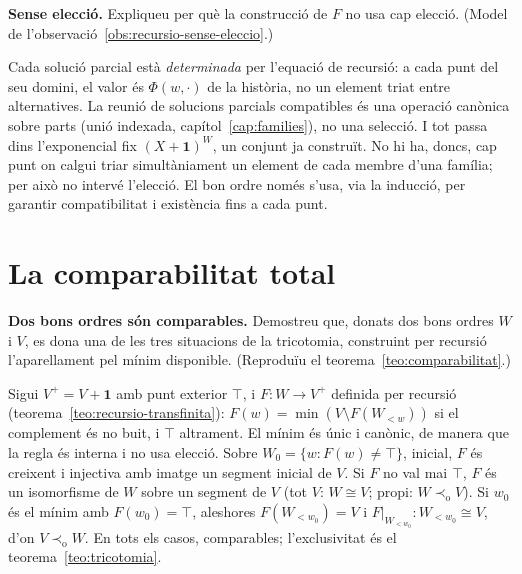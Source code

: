 \begin{exercici}
\textbf{Sense elecció.} Expliqueu per què la construcció de \(F\) no usa cap elecció. (Model de l'observació~\ref{obs:recursio-sense-eleccio}.)
\end{exercici}
\begin{solucio}
Cada solució parcial està \emph{determinada} per l'equació de recursió: a cada punt del seu domini, el valor és \(\Phi(w,\cdot)\) de la història, no un element triat entre alternatives. La reunió de solucions parcials compatibles és una operació canònica sobre parts (unió indexada, capítol~\ref{cap:families}), no una selecció. I tot passa dins l'exponencial fix \((X+\mathbf1)^W\), un conjunt ja construït. No hi ha, doncs, cap punt on calgui triar simultàniament un element de cada membre d'una família; per això no intervé l'elecció. El bon ordre només s'usa, via la inducció, per garantir compatibilitat i existència fins a cada punt.
\end{solucio}

\section{La comparabilitat total}\label{prac:comparabilitat}

\begin{exercici}
\textbf{Dos bons ordres són comparables.} Demostreu que, donats dos bons ordres \(W\) i \(V\), es dona una de les tres situacions de la tricotomia, construint per recursió l'aparellament pel mínim disponible. (Reproduïu el teorema~\ref{teo:comparabilitat}.)
\end{exercici}
\begin{solucio}
Sigui \(V^+=V+\mathbf1\) amb punt exterior \(\top\), i \(F\colon W\to V^+\) definida per recursió (teorema~\ref{teo:recursio-transfinita}): \(F(w)=\min(V\setminus F(W_{<w}))\) si el complement és no buit, i \(\top\) altrament. El mínim és únic i canònic, de manera que la regla és interna i no usa elecció. Sobre \(W_0=\{w:F(w)\ne\top\}\), inicial, \(F\) és creixent i injectiva amb imatge un segment inicial de \(V\). Si \(F\) no val mai \(\top\), \(F\) és un isomorfisme de \(W\) sobre un segment de \(V\) (tot \(V\): \(W\cong V\); propi: \(W\prec_{\mathrm o}V\)). Si \(w_0\) és el mínim amb \(F(w_0)=\top\), aleshores \(F(W_{<w_0})=V\) i \(F|_{W_{<w_0}}\colon W_{<w_0}\cong V\), d'on \(V\prec_{\mathrm o}W\). En tots els casos, comparables; l'exclusivitat és el teorema~\ref{teo:tricotomia}.
\end{solucio}

